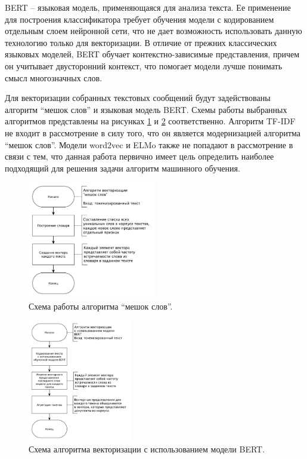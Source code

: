 BERT \cite{bert} -- языковая модель, применяющаяся для анализа текста. Ее применение для построения классификатора требует обучения модели с кодированием отдельным слоем нейронной сети, что не дает возможность использовать данную технологию только для векторизации.
В отличие от прежних классических языковых моделей, BERT обучает контекстно-зависимые представления, причем он учитывает двусторонний контекст, что помогает модели лучше понимать смысл многозначных слов.~\cite{vectorizations}

Для векторизации собранных текстовых сообщений будут задействованы алгоритм ``мешок слов'' и языковая модель BERT.
Схемы работы выбранных алгоритмов представлены на рисунках \ref{img:schemeBagOfWords} и \ref{img:schemeBert} соответственно.
Алгоритм TF-IDF не входит в рассмотрение в силу того, что он является модернизацией алгоритма ``мешок слов''. 
Модели word2vec и ELMo также не попадают в рассмотрение в связи с тем, что данная работа первично имеет цель определить наиболее подходящий для решения задачи алгоритм машинного обучения.

\begin{figure}[H]
	\centering
	\includegraphics[width=0.5\textwidth]{inc/schemeBagOfWords.pdf}
	\caption{ Схема работы алгоритма ``мешок слов''. }
	\label{img:schemeBagOfWords}
\end{figure}

\begin{figure}[H]
	\centering
	\includegraphics[width=0.4\textwidth]{inc/schemeBert.pdf}
	\caption{ Схема алгоритма векторизации с использованием модели BERT. }
	\label{img:schemeBert}
\end{figure}

